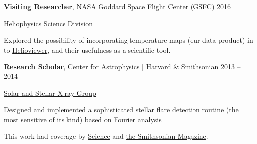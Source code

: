 \documentclass[11pt]{article}
\newcommand{\halfblankline}{\quad\vspace{-0.5\baselineskip}\pagebreak[3]}
\begin{document}
\textbf{Visiting Researcher},
	\href{https://www.nasa.gov/goddard}{NASA Goddard Space Flight Center (GSFC)} \hfill {2016}
\begin{innerlist}

    \item[] \href{https://science.gsfc.nasa.gov/heliophysics/}{Heliophysics Science Division}
    \begin{innerlist}
    	\item{} Explored the possibility of incorporating temperature maps (our data product) in to \href{www.helioviewer.org}{Helioviewer}, and their usefulness as a scientific tool.
    \end{innerlist}

\end{innerlist}

\halfblankline

 \textbf{Research Scholar},
	\href{https://www.cfa.harvard.edu/}{Center for Astrophysics | Harvard \& Smithsonian} \hfill {2013 -- 2014}
\begin{innerlist}

    \item[] \href{https://www.cfa.harvard.edu/research/hea/sun}{Solar and Stellar X-ray Group}
    \begin{innerlist}
    	\item{} Designed and implemented a sophisticated stellar flare detection routine (the most sensitive of its kind) based on Fourier analysis
    	\item{} This work had coverage by \href{http://www.sciencemag.org/news/2015/08/when-sun-s-next-superflare-due?rss=1}{Science} and \href{http://www.smithsonianmag.com/smart-news/when-next-solar-superflare-hit-earth-180956288/}{the Smithsonian Magazine}.%
    \end{innerlist}    	
\end{innerlist}

%
%
%
\end{document}
